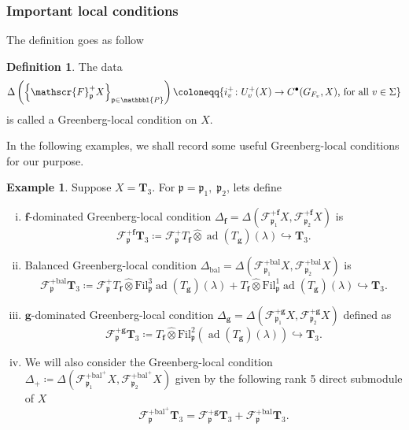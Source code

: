 \documentclass[10pt]{amsart}
\numberwithin{equation}{section}
\theoremstyle{definition}
\newtheorem{defn}[thm]{Definition}
\newtheorem{exmp}[thm]{Example}
\theoremstyle{remark} %
\newcommand{\ad}{\operatorname{ad}}
\newcommand{\f}{\mathbf{f}}
\newcommand{\scrF}{\mathscr{F}}
\newcommand{\g}{\mathbf{g}}
\newcommand{\p}{\mathfrak{p}}
\newcommand{\bP}{\mathbbl{P}}
\newcommand{\T}{\mathbf{T}}
\begin{document}
	\subsubsection{Important local conditions}The definition goes as follow
	\begin{defn}
		The data $$ \Delta\left( \left\lbrace \scrF^+_{\p}X\right\rbrace_{\p \in \bP} \right)  \coloneqq \{i_{v}^+ \colon U_{v}^+(X) \rightarrow C^{\bullet}(G_{F_v},X) \text{, for all } v \in \Sigma\}$$ is called a Greenberg-local condition on $ X $.
	\end{defn}
	In the following examples, we shall record some useful Greenberg-local conditions for our purpose.  
	\begin{exmp}
		Suppose $ X = \T_3 $. For $ \p = \p_1, \; \p_2 $, lets define
		\begin{enumerate}[(i)]
			\item $\f$-dominated Greenberg-local condition $ \Delta_{\mathbf{f}} = \Delta (\scrF^{+\mathbf{f}}_{\p_1}X,\scrF^{+\mathbf{f}}_{\p_2}X) $ is 
			\begin{equation*}
				\scrF^{+\mathbf{f}}_{\p}\T_{3} \coloneqq \scrF^{+}_{\p}T_{\f} \widehat{\otimes} \ad(T_{\g})(\lambda)  \hookrightarrow \T_3. 
			\end{equation*}
			\item Balanced Greenberg-local condition $\Delta_{\mathrm{bal}} = \Delta (\scrF^{+\mathrm{bal}}_{\p_1}X,\scrF^{+\mathrm{bal}}_{\p_2}X) $ is
			\begin{equation*}
				\scrF^{+\mathrm{bal}}_{\p}\T_{3} \coloneqq \scrF^{+}_{\p}T_{\f} \widehat{\otimes} \mathrm{Fil}^3_{\p} \ad(T_\g)(\lambda)   +T_{\f} \widehat{\otimes} \mathrm{Fil}^1_{\p}\ad(T_\g)(\lambda) \hookrightarrow \T_3.
			\end{equation*}
			\item $ \g $-dominated Greenberg-local condition $\Delta_{\g} = \Delta(\scrF^{+\g}_{\p_1}X, \scrF^{+\g}_{\p_2}X) $ defined as
			\begin{equation*}
				\scrF^{+\g}_{\p}\T_{3} \coloneqq T_{\f} \widehat{\otimes} \mathrm{Fil}^2_{\p}(\ad(T_\g)(\lambda)) \hookrightarrow \T_3.
			\end{equation*}
			\item We will also consider the Greenberg-local condition $ \Delta_{+}\coloneqq\Delta(\scrF^{+\mathrm{bal}^+}_{\p_1}X, \scrF^{+\mathrm{bal}^+}_{\p_2}X) $ given by the following rank 5 direct submodule of $ X $
			\begin{equation*}
				\scrF^{+\mathrm{bal}^+}_{\p} \T_{3} = \scrF^{+\g}_{\p}\T_{3} + \scrF^{+\mathrm{bal}}_{\p}\T_{3}.
			\end{equation*}
		\end{enumerate}
	\end{exmp}
\end{document}
